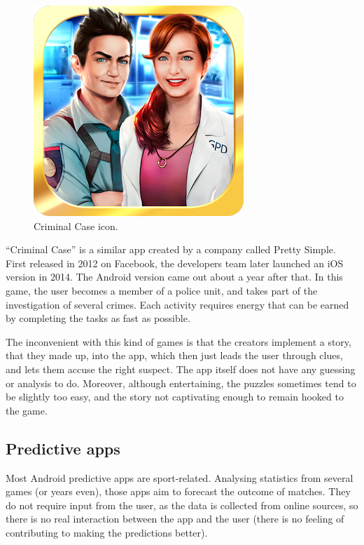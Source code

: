 \documentclass{mproj}
\begin{document}
\begin{figure}
	\vspace{-10pt}
	\centering
	\includegraphics[scale=0.25]{images/criminalcase_icon}
	\caption{Criminal Case icon.}
	\vspace{-30pt}
\end{figure}

``Criminal Case'' \cite{criminalcase} is a similar app created by a company called Pretty Simple. First released in 2012 on Facebook, the developers team later launched an iOS version in 2014. The Android version came out about a year after that. In this game, the user becomes a member of a police unit, and takes part of the investigation of several crimes. Each activity requires energy that can be earned by completing the tasks as fast as possible.\\ \par

The inconvenient with this kind of games is that the creators implement a story, that they made up, into the app, which then just leads the user through clues, and lets them accuse the right suspect. The app itself does not have any guessing or analysis to do.
Moreover, although entertaining, the puzzles sometimes tend to be slightly too easy, and the story not captivating enough to remain hooked to the game.

\subsection*{Predictive apps}

Most Android predictive apps are sport-related. Analysing statistics from several games (or years even), those apps aim to forecast the outcome of matches. 
They do not require input from the user, as the data is collected from online sources, so there is no real interaction between the app and the user (there is no feeling of contributing to making the predictions better).
\end{document}
